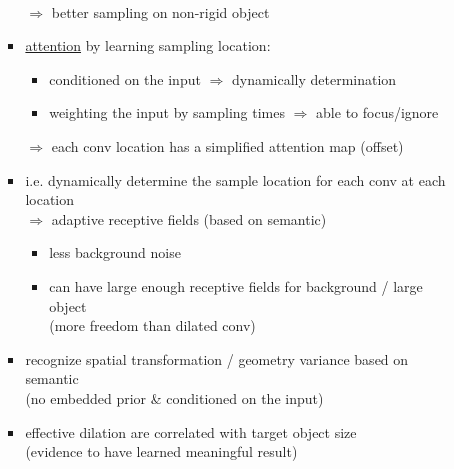 \begin{itemize}
\begin{itemize}
\begin{itemize}
\begin{minipage}[r]{.4\linewidth}
		\end{minipage} \\
		$\Rightarrow$ better sampling on non-rigid object
		\item \underline{attention} by learning sampling location:
			\begin{itemize}
			\item conditioned on the input $\Rightarrow$ dynamically determination
			\item weighting the input by sampling times $\Rightarrow$ able to focus/ignore
			\end{itemize}
		$\Rightarrow$ each conv location has a simplified attention map (offset)
		\item i.e. dynamically determine the sample location for each conv at each location \\
		$\Rightarrow$ adaptive receptive fields (based on semantic)
			\begin{itemize}
			\item less background noise
			\item can have large enough receptive fields for background / large object \\
			(more freedom than dilated conv)
			\end{itemize}
		\item recognize spatial transformation / geometry variance based on semantic \\
		(no embedded prior \& conditioned on the input)
		\item effective dilation are correlated with target object size \\
		(evidence to have learned meaningful result)
		\end{itemize}
	\end{itemize}
\end{itemize}

